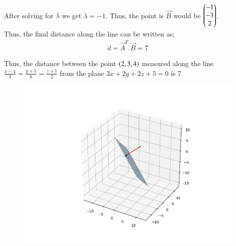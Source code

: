 \documentclass[journal]{IEEEtran}
\begin{document}
After solving for $\lambda$ we get $\lambda=-1$. Thus, the point is $\Vec{B}$ would be $\begin{pmatrix}-1 \\ -3 \\ 2\end{pmatrix}$. \\

Thus, the final distance along the line can be written as;
\begin{align}
d=\Vec{A}^T.\Vec{B}=7
\end{align}

Thus, the distance between the point $\left(2,3,4\right)$ measured along the line $\frac{x-4}{3}=\frac{y+5}{6}=\frac{z+1}{2}$ from the plane $3x+2y+2z+5=0$ is $7$

\begin{figure}[H]
\centering
\includegraphics[width=0.8\columnwidth]{figs/img.png}
\caption*{}
\end{figure}
\end{document}

